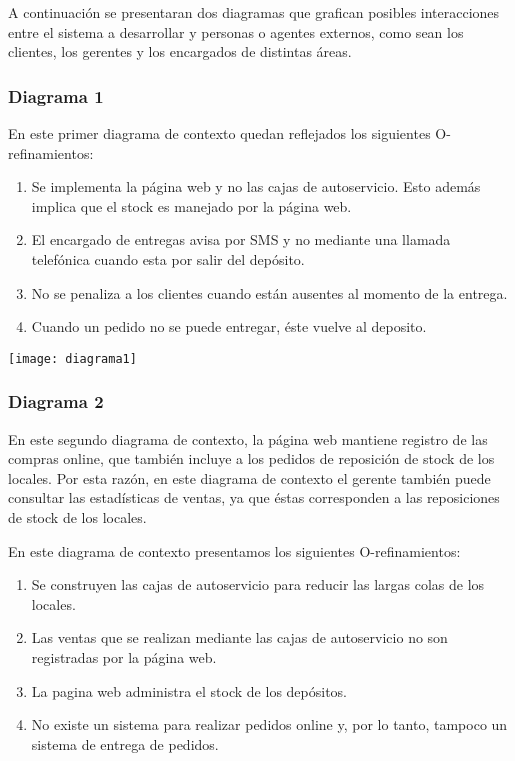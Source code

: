 A continuación se presentaran dos diagramas que grafican posibles interacciones
entre el sistema a desarrollar y personas o agentes externos, como sean los
clientes, los gerentes y los encargados de distintas áreas.

\subsubsection{Diagrama 1}
En este primer diagrama de contexto quedan reflejados los siguientes O-refinamientos:
\begin{enumerate}
\item Se implementa la página web y no las cajas de autoservicio. Esto además implica que el stock es manejado por la página web.
\item El encargado de entregas avisa por SMS y no mediante una llamada telefónica cuando esta por salir del depósito.
\item No se penaliza a los clientes cuando están ausentes al momento de la entrega.
\item Cuando un pedido no se puede entregar, éste vuelve al deposito.
\end{enumerate}

\texttt{[image: diagrama1]}

\subsubsection{Diagrama 2}
En este segundo diagrama de contexto, la página web mantiene registro de las compras online, que también incluye a los pedidos de reposición de stock de los locales. Por esta razón, en este diagrama de contexto el gerente también puede consultar las estadísticas de ventas, ya que éstas corresponden a las reposiciones de stock de los locales.

En este diagrama de contexto presentamos los siguientes O-refinamientos:
\begin{enumerate}
\item Se construyen las cajas de autoservicio para reducir las largas colas de los locales.
\item Las ventas que se realizan mediante las cajas de autoservicio no son registradas por la página web.
\item La pagina web administra el stock de los depósitos.
\item No existe un sistema para realizar pedidos online y, por lo tanto, tampoco un sistema de entrega de pedidos.	
\end{enumerate}

